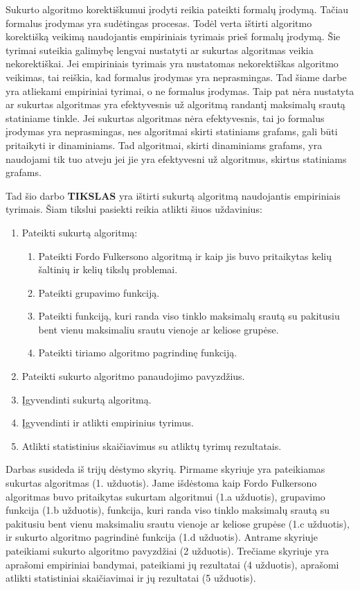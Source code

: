 Sukurto algoritmo korektiškumui įrodyti reikia pateikti formalų įrodymą. Tačiau formalus įrodymas yra sudėtingas procesas. Todėl verta ištirti algoritmo korektišką veikimą naudojantis empiriniais tyrimais prieš formalų įrodymą. Šie tyrimai suteikia galimybę lengvai nustatyti ar sukurtas algoritmas veikia nekorektiškai. Jei empiriniais tyrimais yra nustatomas nekorektiškas algoritmo veikimas, tai reiškia, kad formalus įrodymas yra neprasmingas. Tad šiame darbe yra atliekami empiriniai tyrimai, o ne formalus įrodymas. Taip pat nėra nustatyta ar sukurtas algoritmas yra efektyvesnis už algoritmą randantį maksimalų srautą statiniame tinkle. Jei sukurtas algoritmas nėra efektyvesnis, tai jo formalus įrodymas yra neprasmingas, nes algoritmai skirti statiniams grafams, gali būti pritaikyti ir dinaminiams. Tad algoritmai, skirti dinaminiams grafams, yra naudojami tik tuo atveju jei jie yra efektyvesni už algoritmus, skirtus statiniams grafams.

Tad šio darbo \textbf{TIKSLAS} yra ištirti sukurtą algoritmą naudojantis empiriniais tyrimais. Šiam tikslui pasiekti reikia atlikti šiuos uždavinius:
\begin{enumerate}
	\item Pateikti sukurtą algoritmą:	
	\begin{enumerate}
		\item  Pateikti Fordo Fulkersono algoritmą ir kaip jis buvo pritaikytas kelių šaltinių ir kelių tikslų problemai.
		\item Pateikti grupavimo funkciją.
		\item Pateikti funkciją, kuri randa viso tinklo maksimalų srautą su pakitusiu bent vienu maksimaliu srautu vienoje ar keliose grupėse.
		\item Pateikti tiriamo algoritmo pagrindinę funkciją.
	\end{enumerate}
	\item Pateikti sukurto algoritmo panaudojimo pavyzdžius.
	\item Įgyvendinti sukurtą algoritmą.
	\item Įgyvendinti ir atlikti empirinius tyrimus.
	\item Atlikti statistinius skaičiavimus su atliktų tyrimų rezultatais.
\end{enumerate}

Darbas susideda iš trijų dėstymo skyrių. Pirmame skyriuje yra pateikiamas sukurtas algoritmas (1. užduotis). Jame išdėstoma kaip Fordo Fulkersono algoritmas buvo pritaikytas sukurtam algoritmui (1.a užduotis), grupavimo funkcija (1.b užduotis), funkcija, kuri randa viso tinklo maksimalų srautą su pakitusiu bent vienu maksimaliu srautu vienoje ar keliose grupėse (1.c užduotis), ir sukurto algoritmo pagrindinė funkcija (1.d užduotis). Antrame skyriuje pateikiami sukurto algoritmo pavyzdžiai (2 užduotis). Trečiame skyriuje yra aprašomi empiriniai bandymai, pateikiami jų rezultatai (4 užduotis), aprašomi atlikti statistiniai skaičiavimai ir jų rezultatai (5 užduotis).